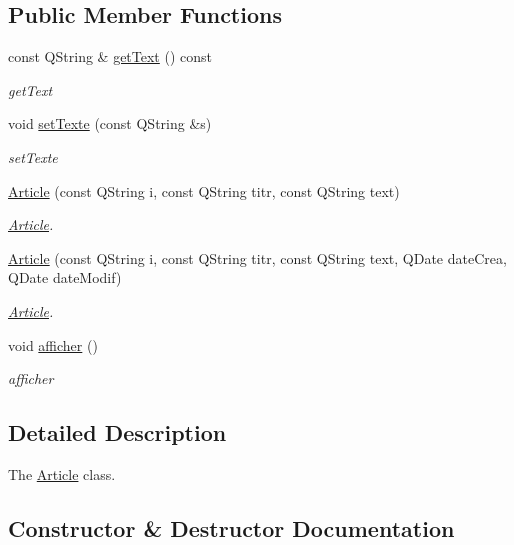 \subsection*{Public Member Functions}
\begin{DoxyCompactItemize}
\item 
const Q\+String \& \hyperlink{class_article_a235fb07dfa8507b171c35624ada564d7}{get\+Text} () const
\begin{DoxyCompactList}\small\item\em get\+Text \end{DoxyCompactList}\item 
void \hyperlink{class_article_aae6c63348c0afa4422ed67afe55b8212}{set\+Texte} (const Q\+String \&s)
\begin{DoxyCompactList}\small\item\em set\+Texte \end{DoxyCompactList}\item 
\hyperlink{class_article_a4c6182f27ba97d7fe2031f1b675dd4a7}{Article} (const Q\+String i, const Q\+String titr, const Q\+String text)
\begin{DoxyCompactList}\small\item\em \hyperlink{class_article}{Article}. \end{DoxyCompactList}\item 
\hyperlink{class_article_a95de3a0b2d11ffe9c0bbf522dbc64c22}{Article} (const Q\+String i, const Q\+String titr, const Q\+String text, Q\+Date date\+Crea, Q\+Date date\+Modif)
\begin{DoxyCompactList}\small\item\em \hyperlink{class_article}{Article}. \end{DoxyCompactList}\item 
\mbox{\label{class_article_a9db30863c1ede5d4c95e93625b620eea}} 
void \hyperlink{class_article_a9db30863c1ede5d4c95e93625b620eea}{afficher} ()
\begin{DoxyCompactList}\small\item\em afficher \end{DoxyCompactList}\end{DoxyCompactItemize}


\subsection{Detailed Description}
The \hyperlink{class_article}{Article} class. 

\subsection{Constructor \& Destructor Documentation}
\mbox{\label{class_article_a4c6182f27ba97d7fe2031f1b675dd4a7}} 
